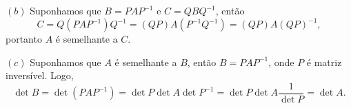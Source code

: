 \documentclass{report}
\begin{document}
\begin{enumerate}
$(b)$ Suponhamos que $B= PAP^{-1}$ e $C= QBQ^{-1}$, então $$C=
Q(PAP^{-1})Q^{-1}=(QP)A(P^{-1}Q^{-1})=(QP)A(QP)^{-1},$$ portanto
$A$ é semelhante a $C$.

$(c)$ Suponhamos que $A$ é semelhante a $B$, então $B= PAP^{-1}$,
onde $P$ é matriz inversível. Logo, $$\det B = \det (PAP^{-1}) =
\det P \det A \det P^{-1} = \det P \det A \frac{1}{\det P}= \det
A.$$














\end{enumerate}
\end{document}
